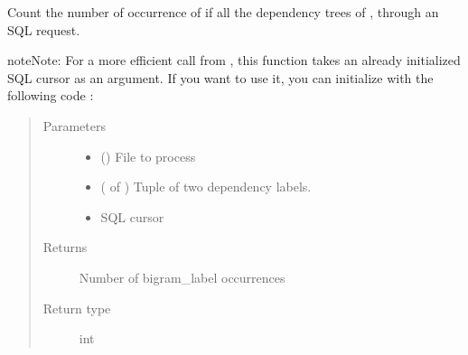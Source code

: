\documentclass[letterpaper,10pt,english]{sphinxmanual}
\begin{document}
\begin{fulllineitems}
\label{\detokenize{analysis:loacore.analysis.frequencies.count_bigram_label}}
Count the number of occurrence of  if all the dependency trees of , through an SQL request.

\begin{sphinxadmonition}{note}{Note:}
For a more efficient call from {\hyperref[\detokenize{analysis:loacore.analysis.frequencies.bigram_label_frequencies}]{}}, this function takes an already initialized SQL
cursor as an argument.
If you want to use it, you can initialize  with the following code :

%
\begin{sphinxVerbatim}[commandchars=\\\{\}]
   
   
  
  
\end{sphinxVerbatim}
\end{sphinxadmonition}
\begin{quote}\begin{description}
\item[{Parameters}] \leavevmode\begin{itemize}
\item {} 
 ({\hyperref[\detokenize{classes:loacore.classes.classes.File}]{}}) \textendash{} File to process

\item {} 
 ( of ) \textendash{} Tuple of two dependency labels.

\item {} 
 \textendash{} SQL cursor

\end{itemize}

\item[{Returns}] \leavevmode
Number of bigram\_label occurrences

\item[{Return type}] \leavevmode
int

\end{description}\end{quote}

\end{fulllineitems}
\end{document}
